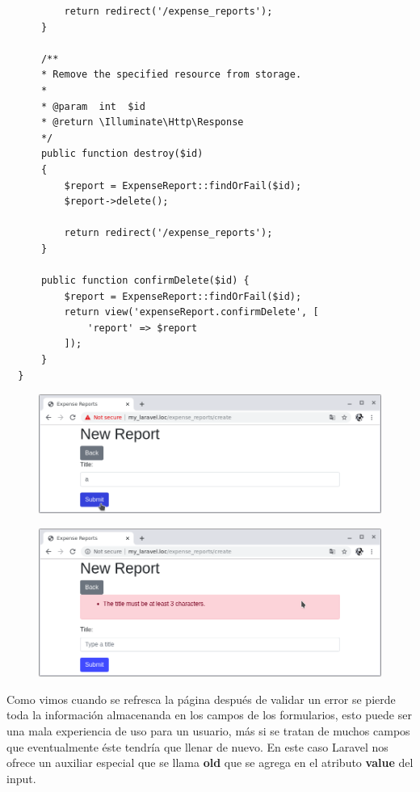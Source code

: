 \documentclass{article}
\begin{document}
\begin{verbatim}
          return redirect('/expense_reports');
      }

      /**
      * Remove the specified resource from storage.
      *
      * @param  int  $id
      * @return \Illuminate\Http\Response
      */
      public function destroy($id)
      {
          $report = ExpenseReport::findOrFail($id);
          $report->delete();

          return redirect('/expense_reports');
      }

      public function confirmDelete($id) {
          $report = ExpenseReport::findOrFail($id);
          return view('expenseReport.confirmDelete', [
              'report' => $report
          ]);
      }
  }
\end{verbatim}

\begin{figure}[h!]
  \centering
  \includegraphics[scale=0.5]{./Pictures/091_submit_a.png}
\end{figure}

\begin{figure}[h!]
  \centering
  \includegraphics[scale=0.5]{./Pictures/092_min3_error.png}
\end{figure}

Como vimos cuando se refresca la página después de validar un error se pierde
toda la información almacenanda en los campos de los formularios, esto puede
ser una mala experiencia de uso para un usuario, más si se tratan de muchos
campos que eventualmente éste tendría que llenar de nuevo. En este caso Laravel
nos ofrece un auxiliar especial que se llama \textbf{old} que se agrega en el
atributo \textbf{value} del input.\\
\end{document}
